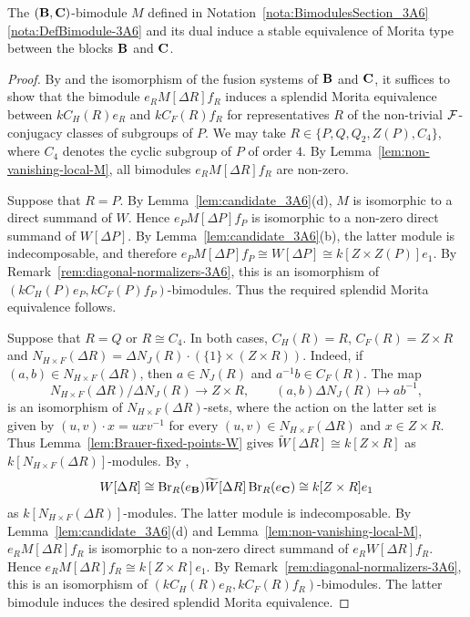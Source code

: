 \begin{prop}\label{prop:gluing-3A6}
The $({\mathbf{B}},{\mathbf{C}})$-bimodule $M$  defined in Notation~\ref{nota:BimodulesSection_3A6}{\rm\ref{nota:DefBimodule-3A6}} and its dual 
induce a stable equivalence of Morita type between the blocks ${\mathbf{B}}$ and ${\mathbf{C}}$. 
\end{prop}
%
\begin{proof}
By \cite[Theorem~3.1]{Lin01} and the isomorphism of the fusion systems of ${\mathbf{B}}$ and ${\mathbf{C}}$, it suffices to show that the bimodule $e_RM[\Delta R]f_R$ induces a splendid Morita equivalence between $kC_H(R)e_R$ and $kC_F(R)f_R$ for representatives $R$ of the non-trivial $\mathcal{F}$-conjugacy classes of subgroups of $P$. We may take $R\in\{P,Q,Q_2,Z(P),C_4\}$,
where $C_4$ denotes the cyclic subgroup of $P$ of order $4$. By Lemma~\ref{lem:non-vanishing-local-M}, all bimodules $e_RM[\Delta R]f_R$ are non-zero.

\medskip 
{} Suppose that $R=P$. By Lemma~\ref{lem:candidate_3A6}(d),
$M$ is isomorphic to a direct summand of $W$. Hence $e_PM[\Delta P]f_P$ is isomorphic to a non-zero direct summand of $W[\Delta P]$. By Lemma~\ref{lem:candidate_3A6}(b), the latter module is indecomposable, and therefore $e_PM[\Delta P]f_P\cong W[\Delta P] \cong k[Z\times Z(P)]e_1$. By Remark~\ref{rem:diagonal-normalizers-3A6}, this is an isomorphism of
$(kC_H(P)e_P,kC_F(P)f_P)$-bimodules. Thus the required splendid Morita
equivalence follows.

\medskip
{} Suppose that $R=Q$ or $R\cong C_4$. In both cases, $C_H(R)=R$, $C_F(R)=Z\times R$ and $N_{H\times F}(\Delta R)=\Delta N_J(R)\cdot (\{1\}\times (Z\times R))$. Indeed, if $(a,b)\in N_{H\times F}(\Delta R)$, then $a\in N_J(R)$ and $a^{-1}b\in C_F(R)$. The map
\[
N_{H\times F}(\Delta R)/\Delta N_J(R)\longrightarrow Z\times R,\qquad (a,b)\Delta N_J(R)\mapsto ab^{-1},
\]
is an isomorphism of $N_{H\times F}(\Delta R)$-sets, where the action on the latter set is given by $(u,v)\cdot x=uxv^{-1}$ for every $(u,v)\in N_{H\times F}(\Delta R)$ and $x\in Z\times R$. Thus Lemma~\ref{lem:Brauer-fixed-points-W} gives $\widetilde{W}[\Delta R]\cong k[Z\times R]$ as $k[N_{H\times F}(\Delta R)]$-modules. By \cite[Lemma~3.7]{BoltjePerepelitsky},
\[
W[\Delta R]\cong \operatorname{Br}_R(e_{\mathbf{B}})\widetilde{W}[\Delta R]\operatorname{Br}_R(e_{\mathbf{C}})\cong k[Z\times R]e_1
\]
as $k[N_{H\times F}(\Delta R)]$-modules. The latter module is indecomposable. By Lemma~\ref{lem:candidate_3A6}(d) and Lemma~\ref{lem:non-vanishing-local-M}, $e_RM[\Delta R]f_R$ is isomorphic to a non-zero direct summand of $e_RW[\Delta R]f_R$. Hence $e_RM[\Delta R]f_R\cong k[Z\times R]e_1$. By Remark~\ref{rem:diagonal-normalizers-3A6}, this is an isomorphism of $(kC_H(R)e_R, kC_F(R)f_R)$-bimodules. The latter bimodule induces the desired splendid Morita equivalence.


\end{proof}

